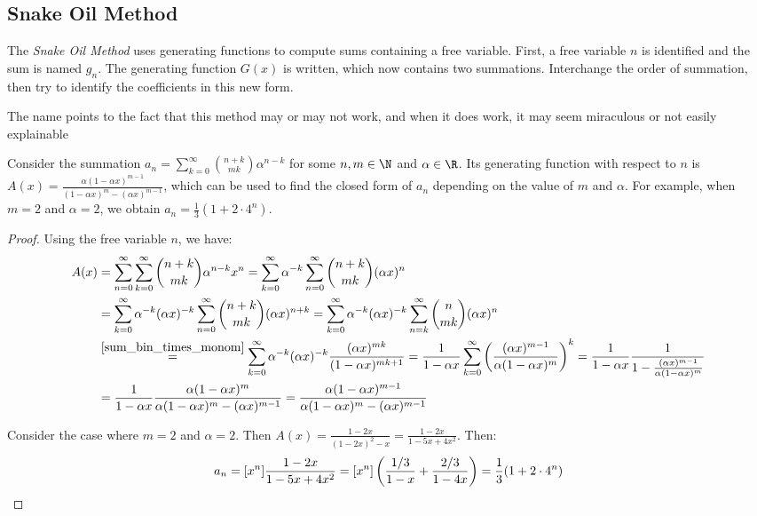 \documentclass[a4paper]{article}
\begin{document}
\subsection{Snake Oil Method}

\begin{concept}
The \emph{Snake Oil Method} uses generating functions to compute sums containing a free variable. First, a free variable $n$ is identified and the sum is named $g_n$. The generating function $G(x)$ is written, which now contains two summations. Interchange the order of summation, then try to identify the coefficients in this new form.
\begin{arrows}
\item The name points to the fact that this method may or may not work, and when it does work, it may seem miraculous or not easily explainable
\end{arrows}
\end{concept}

\begin{example}
Consider the summation $a_n=\displaystyle\sum_{k=0}^\infty\binom{n+k}{mk}\alpha^{n-k}$ for some $n,m\in\N$ and $\alpha\in\R$. Its generating function with respect to $n$ is $\displaystyle A(x)=\frac{\alpha(1-\alpha x)^{m-1}}{(1-\alpha x)^m-(\alpha x)^{m-1}}$, which can be used to find the closed form of $a_n$ depending on the value of $m$ and $\alpha$. For example, when $m=2$ and $\alpha=2$, we obtain $a_n=\frac13(1+2\cdot4^n)$.

\begin{hl}
\begin{proof}
Using the free variable $n$, we have:
\begin{align*}
A(x)
&=\sum_{n=0}^\infty\sum_{k=0}^\infty\binom{n+k}{mk}\alpha^{n-k}x^n
=\sum_{k=0}^\infty\alpha^{-k}\sum_{n=0}^\infty\binom{n+k}{mk}(\alpha x)^n\\
&=\sum_{k=0}^\infty\alpha^{-k}(\alpha x)^{-k}\sum_{n=0}^\infty\binom{n+k}{mk}(\alpha x)^{n+k}
=\sum_{k=0}^\infty\alpha^{-k}(\alpha x)^{-k}\sum_{n=k}^\infty\binom{n}{mk}(\alpha x)^{n}\\
&\overset{\ref{sum_bin_times_monom}}=\sum_{k=0}^\infty\alpha^{-k}(\alpha x)^{-k}\frac{(\alpha x)^{mk}}{(1-\alpha x)^{mk+1}}
=\frac1{1-\alpha x}\sum_{k=0}^\infty\left(\frac{(\alpha x)^{m-1}}{\alpha(1-\alpha x)^m}\right)^k
=\frac1{1-\alpha x}\frac{1}{1-\frac{(\alpha x)^{m-1}}{\alpha(1-\alpha x)^m}}\\
&=\frac1{1-\alpha x}\frac{\alpha(1-\alpha x)^m}{\alpha(1-\alpha x)^m-(\alpha x)^{m-1}}
=\frac{\alpha(1-\alpha x)^{m-1}}{\alpha(1-\alpha x)^m-(\alpha x)^{m-1}}
\end{align*}

Consider the case where $m=2$ and $\alpha=2$. Then $A(x)=\frac{1-2 x}{(1-2 x)^2-x}=\frac{1-2x}{1-5x+4x^2}$. Then:
\begin{equation*}
a_n=[x^n]\frac{1-2x}{1-5x+4x^2}
=[x^n]\left(\frac{1/3}{1-x}+\frac{2/3}{1-4x}\right)
=\frac13(1+2\cdot4^n)\qedhere
\end{equation*}
\end{proof}
\end{hl}
\end{example}
\end{document}
